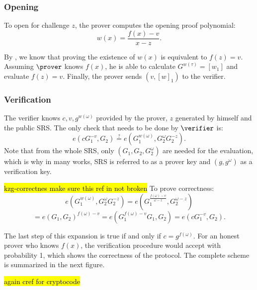 \subsubsection{Opening}
To open for challenge $z$, the prover computes the opening proof polynomial:
$$w(x) = \frac{f(x)-v}{x-z}.$$

By , we know that proving the existence of $w(x)$ is equivalent to $f(z) = v$. Assuming $\prover$ knows $f(x)$, he is able to calculate $G^{w(\tau)}  = [w_1]$ and evaluate $f(z) = v$. Finally, the prover sends $(v, [w]_1)$ to the verifier. 

\subsubsection{Verification}
The verifier knows $c, v, g^{w(\omega)}$ provided by the prover, $z$ generated by himself and the public SRS. The only check that needs to be done by $\verifier$ is:
$$e(cG_1^{-v}, G_2) \stackrel{?}{=} e(G_1^{w(\omega)}, G_2^{\omega} G_2^{-z}).$$
Note that from the whole SRS, only $(G_1, G_2, G_2^\omega)$ are needed for the evaluation, which is why in many works, SRS is referred to as a prover key and $(g, g^\omega)$ as a verification key. 

\hl{kzg-correctnes make sure this ref in not broken}
To prove correctness: $$e(G_1^{w(\omega)}, G_2^{\omega} G_2^{-z}) = e(G_1^{\frac{f(\omega) -v}{\omega -z}}, G_2^{\omega -z})$$ 
$$= e(G_1, G_2)^{f(\omega) -v} = e(G_1^{f(\omega)-v} G_1, G_2) = e(c G_1^{-v}, G_2).$$

The last step of this expansion is true if and only if $c = g^{f(\omega)}$. For an honest prover who knows $f(x)$, the verification procedure would accept with probability 1, which shows the correctness of the protocol. The complete scheme is summarized in the next figure.

\hl{again cref for cryptocode}


